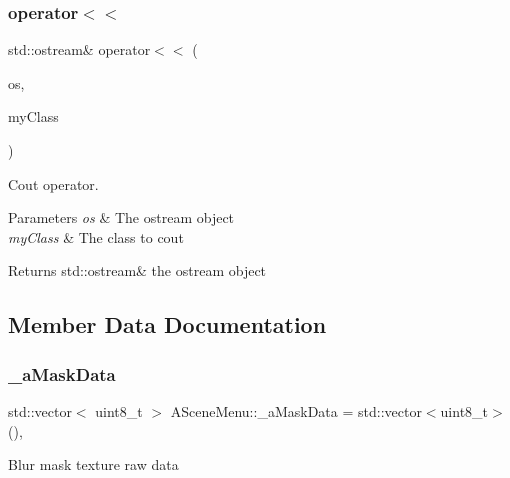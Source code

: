 \subsubsection{\texorpdfstring{operator$<$$<$}{operator<<}}
{\footnotesize\ttfamily std\+::ostream\& operator$<$$<$ (\begin{DoxyParamCaption}\item[{std\+::ostream \&}]{os,  }\item[{const \hyperlink{class_a_scene_menu}{A\+Scene\+Menu} \&}]{my\+Class }\end{DoxyParamCaption})\hspace{0.3cm}{\ttfamily [friend]}}



Cout operator. 


\begin{DoxyParams}{Parameters}
{\em os} & The ostream object \\
\hline
{\em my\+Class} & The class to cout \\
\hline
\end{DoxyParams}
\begin{DoxyReturn}{Returns}
std\+::ostream\& the ostream object 
\end{DoxyReturn}


\subsection{Member Data Documentation}
\mbox{\label{class_a_scene_menu_add676821713fff2c6117e72bd6f9fdd3}} 
\subsubsection{\texorpdfstring{\+\_\+a\+Mask\+Data}{\_aMaskData}}
{\footnotesize\ttfamily std\+::vector$<$ uint8\+\_\+t $>$ A\+Scene\+Menu\+::\+\_\+a\+Mask\+Data = std\+::vector$<$uint8\+\_\+t$>$()\hspace{0.3cm}{\ttfamily [static]}, {\ttfamily [protected]}}

Blur mask texture raw data \mbox{\label{class_a_scene_menu_ad7e81a98550d9756defeec59936615bd}} 
